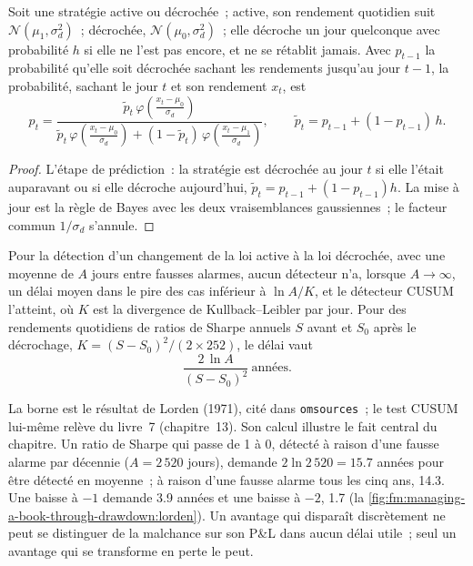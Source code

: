 \begin{proposition}\label{prop:fm:managing-a-book-through-drawdown:posterior}
Soit une stratégie active ou décrochée~; active, son rendement quotidien suit $\mathcal N(\mu_1,\sigma_d^2)$~; décrochée, $\mathcal N(\mu_0,\sigma_d^2)$~; elle décroche
un jour quelconque avec probabilité $h$ si elle ne l'est pas encore, et ne se rétablit jamais. Avec $p_{t-1}$ la probabilité qu'elle soit décrochée sachant les rendements jusqu'au jour
$t-1$, la probabilité, sachant le jour $t$ et son rendement $x_t$, est
\[
p_t=\frac{\tilde p_t\,\varphi\!\left(\frac{x_t-\mu_0}{\sigma_d}\right)}{\tilde p_t\,\varphi\!\left(\frac{x_t-\mu_0}{\sigma_d}\right)+(1-\tilde p_t)\,\varphi\!\left(\frac{x_t-\mu_1}{\sigma_d}\right)},
\qquad \tilde p_t=p_{t-1}+(1-p_{t-1})\,h .
\]
\end{proposition}

\begin{proof}
L'étape de prédiction~: la stratégie est décrochée au jour $t$ si elle l'était auparavant ou si elle décroche aujourd'hui, $\tilde p_t=p_{t-1}+(1-p_{t-1})h$. La mise à jour est
la règle de Bayes avec les deux vraisemblances gaussiennes~; le facteur commun $1/\sigma_d$ s'annule.
\end{proof}

\begin{proposition}\label{prop:fm:managing-a-book-through-drawdown:lorden}
Pour la détection d'un changement de la loi active à la loi décrochée, avec une moyenne de $A$ jours entre fausses alarmes, aucun détecteur n'a, lorsque
$A\to\infty$, un délai moyen dans le pire des cas inférieur à $\ln A/K$, et le détecteur CUSUM l'atteint, où $K$ est la divergence de Kullback--Leibler
par jour. Pour des rendements quotidiens de ratios de Sharpe annuels $S$ avant et $S_0$ après le décrochage, $K=(S-S_0)^2/(2\times252)$, le délai vaut
\[
\frac{2\,\ln A}{(S-S_0)^2}\ \text{années}.
\]
\end{proposition}

\admitted

La borne est le résultat de Lorden (1971), cité dans \texttt{omsources}~; le test CUSUM lui-même relève du livre~7 (chapitre~13). Son calcul illustre le
fait central du chapitre. Un ratio de Sharpe qui passe de 1 à 0, détecté à raison d'une fausse alarme par décennie ($A=2\,520$ jours), demande
$2\ln2\,520=15.7$ années pour être détecté en moyenne~; à raison d'une fausse alarme tous les cinq ans, 14.3. Une baisse à $-1$ demande 3.9 années et une baisse à $-2$, 1.7
(la \cref{fig:fm:managing-a-book-through-drawdown:lorden}). Un avantage qui disparaît discrètement ne peut se distinguer de la malchance sur son P\&L dans aucun
délai utile~; seul un avantage qui se transforme en perte le peut.

